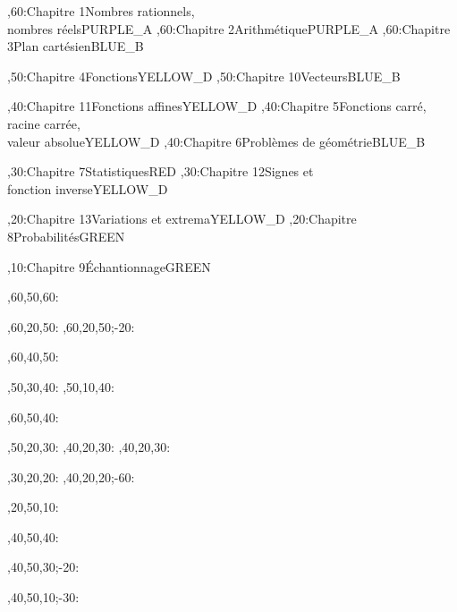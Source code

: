 \documentclass[tikz]{standalone}
\begin{document}
%
	\begin{chart}
	,60:{Chapitre 1}{Nombres rationnels, \\ nombres réels}{}{PURPLE_A}
	,60:{Chapitre 2}{Arithmétique}{}{PURPLE_A}
	,60:{Chapitre 3}{Plan cartésien}{}{BLUE_B}
	
	,50:{Chapitre 4}{Fonctions}{}{YELLOW_D}
	,50:{Chapitre 10}{Vecteurs}{}{BLUE_B}
	
	,40:{Chapitre 11}{Fonctions affines}{}{YELLOW_D}
	,40:{Chapitre 5}{Fonctions carré, \\ racine carrée, \\ valeur absolue}{}{YELLOW_D}
	,40:{Chapitre 6}{Problèmes de géométrie}{}{BLUE_B}
	
	,30:{Chapitre 7}{Statistiques}{}{RED}
	,30:{Chapitre 12}{Signes et \\ fonction inverse}{}{YELLOW_D}
	
	,20:{Chapitre 13}{Variations et extrema}{}{YELLOW_D}
	,20:{Chapitre 8}{Probabilités}{}{GREEN}
	
	,10:{Chapitre 9}{Échantionnage}{}{GREEN}

	,60,50,60:
	
	,60,20,50:
	,60,20,50;-20:
	
	,60,40,50:
	
	,50,30,40:
	,50,10,40:
	
	,60,50,40:
	
	,50,20,30:
	,40,20,30:
	,40,20,30:
	
	,30,20,20:
	,40,20,20;-60:
	
	,20,50,10:
	
	
	
	,40,50,40:
	
	,40,50,30;-20:
	
	
	,40,50,10;-30:
	
	\end{chart}
%
\end{document}
